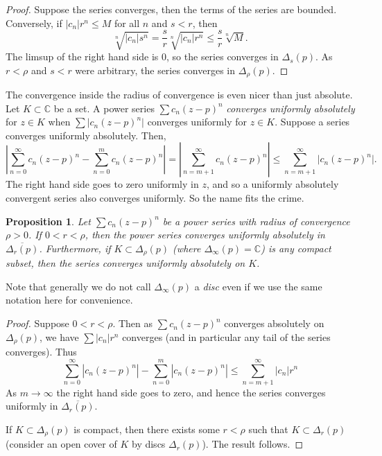 \documentclass[12pt,openany]{book}
\newcommand{\sabs}[1]{\lvert {#1} \rvert}
\newcommand{\abs}[1]{\left\lvert {#1} \right\rvert}
\newcommand{\C}{{\mathbb{C}}}
\newcommand{\myindex}[1]{#1\index{#1}}
\theoremstyle{plain}
\newtheorem{prop}[thm]{Proposition}
\theoremstyle{remark}
\theoremstyle{definition}
\theoremstyle{exercise}
\theoremstyle{example}
\begin{document}
\begin{proof}
Suppose the series converges, then the terms of the series are bounded.
Conversely, if 
$\sabs{c_n} r^n \leq M$ for all $n$ and $s < r$, then
\begin{equation*}
\sqrt[n]{\sabs{c_n} s^n}=
\frac{s}{r}\sqrt[n]{\sabs{c_n} r^n} \leq \frac{s}{r} \sqrt[n]{M} .
\end{equation*}
The limsup of the right hand side is 0, so the series converges in
$\Delta_s(p)$.  As $r < \rho$ and $s < r$ were arbitrary,
the series converges in $\Delta_\rho(p)$.
\end{proof}

The convergence inside the radius of convergence is even nicer than just absolute.
Let $K \subset \C$ be a set.
A power series $\sum c_n {(z-p)}^n$
\emph{\myindex{converges uniformly absolutely}}
for $z \in K$ when $\sum \sabs{c_n {(z-p)}^n}$
converges uniformly for $z \in K$.
Suppose a series converges uniformly absolutely.  Then,
\begin{equation*}
\abs{
\sum_{n=0}^\infty c_n {(z-p)}^n
-
\sum_{n=0}^{m} c_n {(z-p)}^n
}
=
\abs{\sum_{n=m+1}^\infty c_n {(z-p)}^n} \leq
\sum_{n=m+1}^\infty \sabs{c_n {(z-p)}^n} .
\end{equation*}
The right hand side goes to zero uniformly in $z$,
and so
a uniformly absolutely convergent series also converges
uniformly.  So the name fits the crime.

\begin{prop}
Let $\sum c_n {(z-p)}^n$ be a power series with radius of convergence $\rho
> 0$.  If $0 < r < \rho$, then the power series converges uniformly absolutely
in $\overline{\Delta_r(p)}$.  Furthermore, if $K \subset \Delta_{\rho}(p)$
(where $\Delta_{\infty}(p) = \C$)
is any compact subset, then the series converges uniformly absolutely on
$K$.
\end{prop}

Note that generally we do not call $\Delta_{\infty}(p)$ a \emph{disc} even
if we use the same notation here for convenience.

\begin{proof}
Suppose $0 < r < \rho$.  Then as $\sum c_n {(z-p)}^n$ converges absolutely
on $\Delta_\rho(p)$, we have
$\sum \sabs{c_n} r^n$ converges (and in particular any tail of
the series converges).  Thus
\begin{equation*}
\sum_{n=0}^\infty \abs{c_n {(z-p)}^n}
-
\sum_{n=0}^{m} \abs{c_n {(z-p)}^n}
\leq
\sum_{n=m+1}^\infty \sabs{c_n} r^n
\end{equation*}
As $m \to \infty$ the right hand side goes to zero, and hence 
the series converges uniformly in $\overline{\Delta_r(p)}$.

If $K \subset \Delta_{\rho}(p)$ is compact, then there exists some $r <
\rho$ such that $K \subset \Delta_r(p)$ (consider an open cover of
$K$ by discs $\Delta_r(p)$).  The result follows.
\end{proof}
\end{document}
